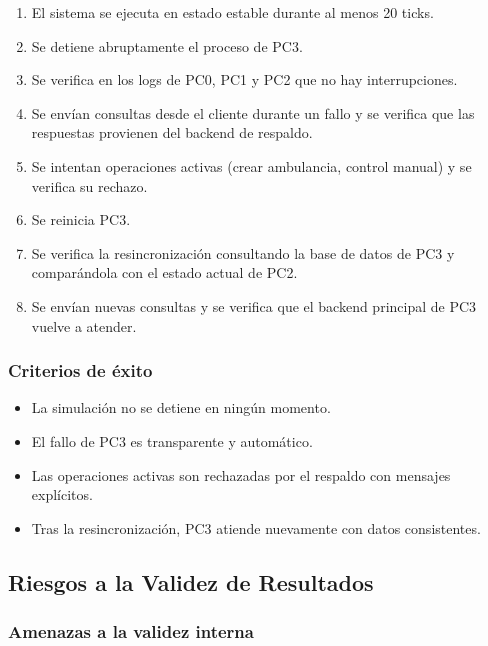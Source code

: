 \documentclass[12pt, a4paper]{article}
\begin{document}
\begin{enumerate}
    \item El sistema se ejecuta en estado estable durante al menos 20 ticks.
    \item Se detiene abruptamente el proceso de PC3.
    \item Se verifica en los logs de PC0, PC1 y PC2 que no hay interrupciones.
    \item Se envían consultas desde el cliente durante un fallo y se verifica que las respuestas provienen del backend de respaldo.
    \item Se intentan operaciones activas (crear ambulancia, control manual) y se verifica su rechazo.
    \item Se reinicia PC3.
    \item Se verifica la resincronización consultando la base de datos de PC3 y comparándola con el estado actual de PC2.
    \item Se envían nuevas consultas y se verifica que el backend principal de PC3 vuelve a atender.
\end{enumerate}

\subsubsection{Criterios de éxito}

\begin{itemize}
    \item La simulación no se detiene en ningún momento.
    \item El fallo de PC3 es transparente y automático.
    \item Las operaciones activas son rechazadas por el respaldo con mensajes explícitos.
    \item Tras la resincronización, PC3 atiende nuevamente con datos consistentes.
\end{itemize}

\subsection{Riesgos a la Validez de Resultados}

\subsubsection{Amenazas a la validez interna}
\end{document}
